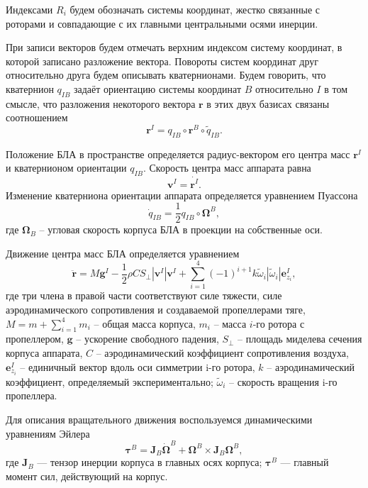 Индексами $R_i$ будем обозначать системы координат, жестко связанные с роторами и совпадающие с их главными центральными осями инерции.

При записи векторов будем отмечать верхним индексом систему координат, в которой записано разложение вектора. Повороты систем координат друг относительно друга будем описывать кватернионами. Будем говорить, что кватернион $q_{IB}$ задаёт ориентацию системы координат $B$ относительно $I$ в том смысле, что разложения некоторого вектора $\bm{r}$ в этих двух базисах связаны соотношением
\begin{equation} \label{eq:m_quat}
\bm{r}^I = q_{IB} \circ \bm{r}^B \circ \tilde{q}_{IB}.
\end{equation}

Положение БЛА в пространстве определяется радиус-вектором его центра масс $\bm{r}^I$ и кватернионом ориентации $q_{IB}$. Скорость центра масс аппарата равна
\begin{equation} \label{eq:m_vel}
\bm{v}^I = \dot{\bm{r}^I}.
\end{equation}
Изменение кватерниона ориентации аппарата определяется уравнением Пуассона
\begin{equation} \label{eq:m_puasson}
\dot{q}_{IB} = \frac{1}{2} {q}_{IB} \circ \bm{\Omega}^B,
\end{equation}
где $\bm{\Omega}_B$ – угловая скорость корпуса БЛА в проекции на собственные оси.

Движение центра масс БЛА определяется уравнением
\begin{equation} \label{eq:m_traslational_motion}
\ddot{\bm{r}} = M \bm{g}^I - \frac{1}{2} \rho C S_{\perp} |\bm{v}^I| \bm{v}^I + \sum_{i=1}^{4}{ { (-1)^{i+1} k \tilde \omega_i |\tilde \omega_i| \bm{e}^I_{z_i}}},
\end{equation}
где три члена в правой части соответствуют силе тяжести, силе аэродинамического сопротивления и создаваемой пропеллерами тяге, $M = m + \sum_{i=1}^{4}{m_i}$ – общая масса корпуса, $m_i$ – масса $i$-го ротора с пропеллером, $\bm g$ – ускорение свободного падения, $S_{\perp}$ – площадь миделева сечения корпуса аппарата, $C$ – аэродинамический коэффициент сопротивления воздуха, $\bm{e}^I_{z_i}$ – единичный вектор вдоль оси симметрии i-го ротора, $k$ – аэродинамический коэффициент, определяемый экспериментально; $\tilde \omega_i$ – скорость вращения i-го пропеллера.

Для описания вращательного движения воспользуемся динамическими уравнениям Эйлера
\begin{equation} \label{eq:m_rotational_motion}
\bm{\tau}^{B} =
\bm{J}_B\dot{\bm{\Omega}}^B + \bm{\Omega}^B \times \bm{J}_B{\bm{\Omega}^B},
\end{equation}
где $\bm{J}_B$ — тензор инерции корпуса в главных осях корпуса; $\bm{\tau}^{B}$ —
главный момент сил, действующий на корпус.

